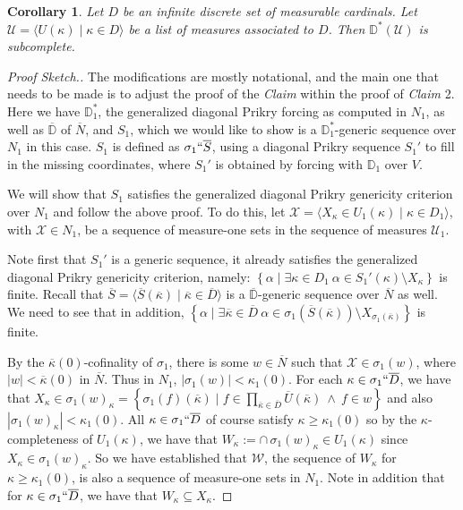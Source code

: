 \documentclass{amsart}
\newtheorem{corollary}[theorem]{Corollary}
\theoremstyle{definition}
\theoremstyle{remark}
\newcommand{\D}{\mathbb{D}}
\newcommand{\N}{{\overline{N}}}
\renewcommand{\S}{{\overline{S}}}
\newcommand{\U}{\mathcal{U}}
\newcommand{\st}{\; | \;}
\newcommand{\set}[2]{\left\{#1\st #2 \right\}}
\newcommand{\seq}[2]{\langle #1 \st #2 \rangle}
\begin{document}
\begin{corollary} 
Let $D$ be an infinite discrete set of measurable cardinals. Let $\U = \seq{ U(\kappa) }{ \kappa \in D }$ be a list of measures associated to $D$. Then $\D^*(\U)$ is subcomplete.
\end{corollary}
\begin{proof}[Proof Sketch.]
The modifications are mostly notational, and the main one that needs to be made is to adjust the proof of the \textit{Claim} within the proof of \textit{Claim} 2. Here we have $\D^*_1$, the generalized diagonal Prikry forcing as computed in $N_1$, as well as $\overline{\D}$ of $\N$, and $S_1$, which we would like to show is a $\D_1^*$-generic sequence over $N_1$ in this case. $S_1$ is defined as $\sigma_1 ``\overline S$, using a diagonal Prikry sequence $S_1'$ to fill in the missing coordinates, where $S_1'$ is obtained by forcing with $\D_1$ over $V$.

We will show that $S_1$ satisfies the generalized diagonal Prikry genericity criterion over $N_1$ and follow the above proof. To do this, let $\mathcal X = \seq{ X_\kappa \in U_1(\kappa) }{ \kappa \in D_1 }$, with $\mathcal X \in N_1$, be a sequence of measure-one sets in the sequence of measures $\U_1$.

Note first that $S_1'$ is a generic sequence, it already satisfies the generalized diagonal Prikry genericity criterion, namely:
$\set{ \alpha }{ \exists \kappa \in D_1 \ \alpha \in S_1'(\kappa) \setminus X_\kappa }$ is finite.
Recall that $\S = \seq{ \S(\overline \kappa) }{ \overline \kappa \in \overline D }$ is a $\overline{\D}$-generic sequence over $\N$ as well.
We need to see that in addition, $\set{ \alpha }{ \exists \overline \kappa \in \overline D \ \alpha \in \sigma_1(\S(\overline \kappa)) \setminus X_{\sigma_1(\overline \kappa)} }$ is finite.

By the $\overline{\kappa}(0)$-cofinality of $\sigma_1$, there is some $w \in \N$ such that $\mathcal X \in \sigma_1(w)$, where $|w| < \overline{\kappa}(0)$ in $\N$. Thus in $N_1$, $|\sigma_1(w)| < \kappa_1(0)$. 
For each $\kappa \in \sigma_1``\overline D$, we have that $X_\kappa \in \sigma_1(w)_\kappa = \set{\sigma_1(f)(\overline \kappa) }{ f \in \prod_{\overline \kappa \in \overline D} \overline U(\overline \kappa) \ \land \ f \in w }$ and also $|\sigma_1(w)_\kappa|<\kappa_1(0).$ All $\kappa \in \sigma_1``\overline D$ of course satisfy $\kappa \geq \kappa_1(0)$ so by the $\kappa$-completeness of $U_1(\kappa)$, we have that $W_\kappa := \cap \, \sigma_1(w)_\kappa \in U_1(\kappa)$ since $X_\kappa \in \sigma_1(w)_\kappa$.
So we have established that $\mathcal W$, the sequence of $W_\kappa$ for $\kappa \geq \kappa_1(0)$, is also a sequence of measure-one sets in $N_1$. Note in addition that for $\kappa \in \sigma_1``\overline D$, we have that $W_\kappa \subseteq X_\kappa$. 


\end{proof}
\end{document}
